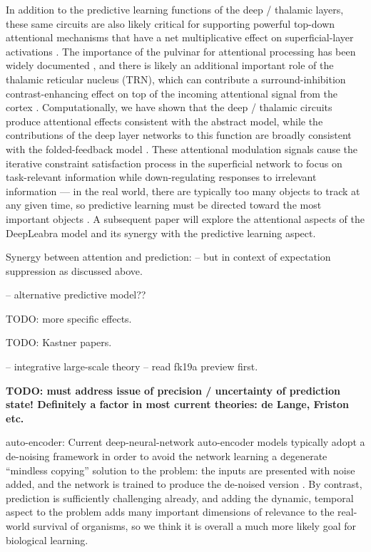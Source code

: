 \documentclass[11pt,twoside]{article}
\newif\myifpdf
\begin{document}
In addition to the predictive learning functions of the deep / thalamic layers, these same circuits are also likely critical for supporting powerful top-down attentional mechanisms that have a net multiplicative effect on superficial-layer activations \citep{BortoneOlsenScanziani14,OlsenBortoneAdesnikEtAl12,BortoneOlsenScanziani14,OlsenBortoneAdesnikEtAl12}. The importance of the pulvinar for attentional processing has been widely documented \cite[e.g.,]{LaBergeBuchsbaum90,BenderYouakim01,SaalmannPinskWangEtAl12}, and there is likely an additional important role of the thalamic reticular nucleus (TRN), which can contribute a surround-inhibition contrast-enhancing effect on top of the incoming attentional signal from the cortex \citep{Crick84,Pinault04,WimmerSchmittDavidsonEtAl15}. Computationally, we have shown that the deep / thalamic circuits produce attentional effects consistent with the abstract \citet{ReynoldsHeeger09} model, while the contributions of the deep layer networks to this function are broadly consistent with the folded-feedback model \citep{Grossberg99}.  These attentional modulation signals cause the iterative constraint satisfaction process in the superficial network to focus on task-relevant information while down-regulating responses to irrelevant information --- in the real world, there are typically too many objects to track at any given time, so predictive learning must be directed toward the most important objects \citep{Pylyshyn89,CavanaghHuntAfrazEtAl10}. A subsequent paper will explore the attentional aspects of the DeepLeabra model and its synergy with the predictive learning aspect.

Synergy between attention and prediction: \citep{RichterdeLange19} -- but in context of expectation suppression as discussed above.

\citep{KellerMrsic-Flogel18} -- alternative predictive model??

TODO: more specific effects.

TODO: Kastner papers.  \citep{HalassaKastner17}   \citep{FiebelkornPinskKastner18}  \citep{FiebelkornKastner19}

\citep{JaramilloMejiasWang19} -- integrative large-scale theory -- read fk19a preview first.

{\bf TODO: must address issue of precision / uncertainty of prediction state!  Definitely a factor in most current theories: de Lange, Friston etc.}

auto-encoder: Current deep-neural-network auto-encoder models typically adopt a de-noising framework in order to avoid the network learning a degenerate ``mindless copying'' solution to the problem: the inputs are presented with noise added, and the network is trained to produce the de-noised version \citep{BengioYaoAlainEtAl13,Valpola14,RasmusBerglundHonkalaEtAl15}.  By contrast, prediction is sufficiently challenging already, and adding the dynamic, temporal aspect to the problem adds many important dimensions of relevance to the real-world survival of organisms, so we think it is overall a much more likely goal for biological learning.
\end{document}
